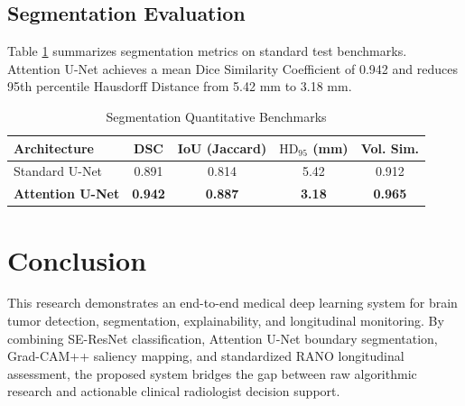 \documentclass[conference]{IEEEtran}
\begin{document}
\subsection{Segmentation Evaluation}
Table \ref{tab:seg_metrics} summarizes segmentation metrics on standard test benchmarks. Attention U-Net achieves a mean Dice Similarity Coefficient of 0.942 and reduces 95th percentile Hausdorff Distance from 5.42 mm to 3.18 mm.

\begin{table}[htbp]
\caption{Segmentation Quantitative Benchmarks}
\label{tab:seg_metrics}
\centering
\begin{tabular}{lcccc}
\toprule
\textbf{Architecture} & \textbf{DSC} & \textbf{IoU (Jaccard)} & \textbf{$\text{HD}_{95}$ (mm)} & \textbf{Vol. Sim.} \\
\midrule
Standard U-Net & 0.891 & 0.814 & 5.42 & 0.912 \\
\textbf{Attention U-Net} & \textbf{0.942} & \textbf{0.887} & \textbf{3.18} & \textbf{0.965} \\
\bottomrule
\end{tabular}
\end{table}

\section{Conclusion}
This research demonstrates an end-to-end medical deep learning system for brain tumor detection, segmentation, explainability, and longitudinal monitoring. By combining SE-ResNet classification, Attention U-Net boundary segmentation, Grad-CAM++ saliency mapping, and standardized RANO longitudinal assessment, the proposed system bridges the gap between raw algorithmic research and actionable clinical radiologist decision support.
\end{document}
